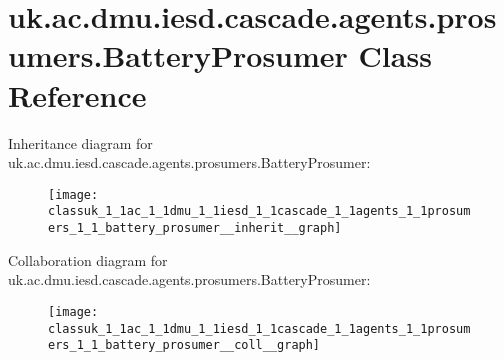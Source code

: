 \hypertarget{classuk_1_1ac_1_1dmu_1_1iesd_1_1cascade_1_1agents_1_1prosumers_1_1_battery_prosumer}{\section{uk.\-ac.\-dmu.\-iesd.\-cascade.\-agents.\-prosumers.\-Battery\-Prosumer Class Reference}
\label{classuk_1_1ac_1_1dmu_1_1iesd_1_1cascade_1_1agents_1_1prosumers_1_1_battery_prosumer}
}


Inheritance diagram for uk.\-ac.\-dmu.\-iesd.\-cascade.\-agents.\-prosumers.\-Battery\-Prosumer\-:\nopagebreak
\begin{figure}[H]
\begin{center}
\leavevmode
\texttt{[image: classuk\_1\_1ac\_1\_1dmu\_1\_1iesd\_1\_1cascade\_1\_1agents\_1\_1prosumers\_1\_1\_battery\_prosumer\_\_inherit\_\_graph]}
\end{center}
\end{figure}


Collaboration diagram for uk.\-ac.\-dmu.\-iesd.\-cascade.\-agents.\-prosumers.\-Battery\-Prosumer\-:\nopagebreak
\begin{figure}[H]
\begin{center}
\leavevmode
\texttt{[image: classuk\_1\_1ac\_1\_1dmu\_1\_1iesd\_1\_1cascade\_1\_1agents\_1\_1prosumers\_1\_1\_battery\_prosumer\_\_coll\_\_graph]}
\end{center}
\end{figure}
